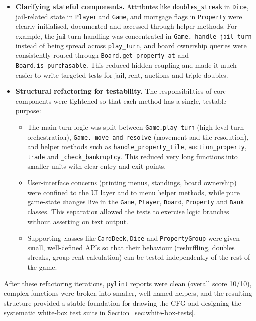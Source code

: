 \documentclass[11pt]{article}
\begin{document}
\begin{itemize}
  \item \textbf{Clarifying stateful components.}  Attributes like \texttt{doubles\_streak} in \texttt{Dice}, jail-related state in \texttt{Player} and \texttt{Game}, and mortgage flags in \texttt{Property} were clearly initialised, documented and accessed through helper methods.  For example, the jail turn handling was concentrated in \texttt{Game.\_handle\_jail\_turn} instead of being spread across \texttt{play\_turn}, and board ownership queries were consistently routed through \texttt{Board.get\_property\_at} and \texttt{Board.is\_purchasable}.  This reduced hidden coupling and made it much easier to write targeted tests for jail, rent, auctions and triple doubles.

  \item \textbf{Structural refactoring for testability.}  The responsibilities of core components were tightened so that each method has a single, testable purpose:
  \begin{itemize}
    \item The main turn logic was split between \texttt{Game.play\_turn} (high-level turn orchestration), \texttt{Game.\_move\_and\_resolve} (movement and tile resolution), and helper methods such as \texttt{handle\_property\_tile}, \texttt{auction\_property}, \texttt{trade} and \texttt{\_check\_bankruptcy}.  This reduced very long functions into smaller units with clear entry and exit points.
    \item User-interface concerns (printing menus, standings, board ownership) were confined to the UI layer and to menu helper methods, while pure game-state changes live in the \texttt{Game}, \texttt{Player}, \texttt{Board}, \texttt{Property} and \texttt{Bank} classes.  This separation allowed the tests to exercise logic branches without asserting on text output.
    \item Supporting classes like \texttt{CardDeck}, \texttt{Dice} and \texttt{PropertyGroup} were given small, well-defined APIs so that their behaviour (reshuffling, doubles streaks, group rent calculation) can be tested independently of the rest of the game.
  \end{itemize}
\end{itemize}

After these refactoring iterations, \texttt{pylint} reports were clean (overall score 10/10), complex functions were broken into smaller, well-named helpers, and the resulting structure provided a stable foundation for drawing the CFG and designing the systematic white-box test suite in Section~\ref{sec:white-box-tests}.
\end{document}
